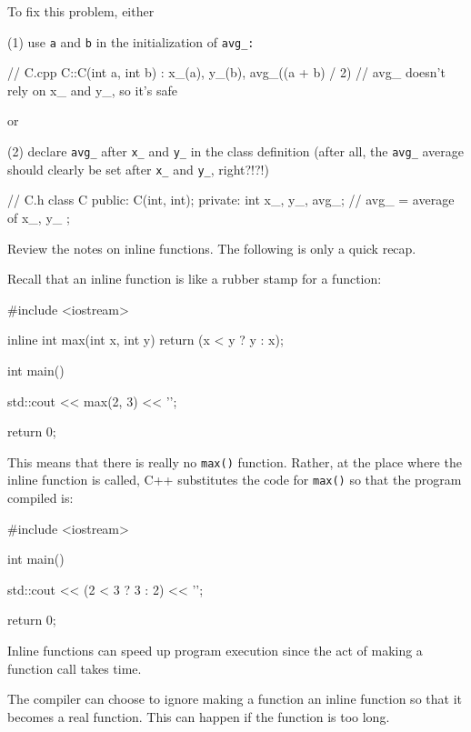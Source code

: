 To fix this problem, either

(1) use \texttt{a} and \texttt{b} in the initialization of \texttt{avg\_:}

\begin{consolethree}[escapeinside=||]
// C.cpp
C::C(int a, int b)
    : x_(a), y_(b), avg_((a + b) / 2)
    // avg_ doesn't rely on x_ and y_, so it's safe
{}
\end{consolethree}

or

(2) declare \texttt{avg\_} after \texttt{x\_} and \texttt{y\_} in the class
definition (after all, the \texttt{avg\_} average should clearly be set
after \texttt{x\_} and \texttt{y\_}, right?!?!)

\begin{consolethree}[escapeinside=||]
// C.h
class C
{
public:
    C(int, int);
private:
    int x_, y_, avg_;
    // avg_ = average of x_, y_
};
\end{consolethree}


\newpage{}

Review the notes on inline functions. The following is only a quick
recap.

Recall that an inline function is like a rubber stamp for a function:

\begin{consolethree}[escapeinside=||]
#include <iostream>

inline int max(int x, int y)
{
    return (x < y ? y : x);
}

int main()
{
    std::cout << max(2, 3) << '\n';

    return 0;
}
\end{consolethree}

This means that there is really no \texttt{max()} function. Rather, at the
place where the inline function is called, C++ substitutes the code for
\texttt{max()} so that the program compiled is:

\begin{consolethree}[escapeinside=||]
#include <iostream>

int main()
{
    std::cout << (2 < 3 ? 3 : 2) << '\n';

    return 0;
}
\end{consolethree}

Inline functions can speed up program execution since the act of making
a function call takes time.

The compiler can choose to ignore making a function an inline function
so that it becomes a real function. This can happen if the function is
too long.

